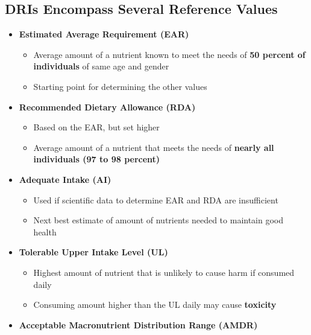 \documentclass[12pt]{article}
\begin{document}
        \subsection{DRIs Encompass Several Reference Values}
            \begin{itemize}
                \item \textbf{Estimated Average Requirement (EAR)}
                    \begin{itemize}
                        \item Average amount of a nutrient known to meet the needs of \textbf{50 percent of individuals} of same age and gender
                        \item Starting point for determining the other values
                    \end{itemize}
                \item \textbf{Recommended Dietary Allowance (RDA)}
                    \begin{itemize}
                        \item Based on the EAR, but set higher
                        \item Average amount of a nutrient that meets the needs of \textbf{nearly all individuals (97 to 98 percent)}
                    \end{itemize}
                \item \textbf{Adequate Intake (AI)}
                    \begin{itemize}
                        \item Used if scientific data to determine EAR and RDA are insufficient
                        \item Next best estimate of amount of nutrients needed to maintain good health
                    \end{itemize}
                \item \textbf{Tolerable Upper Intake Level (UL)}
                    \begin{itemize}
                        \item Highest amount of nutrient that is unlikely to cause harm if consumed daily
                        \item Consuming amount higher than the UL daily may cause \textbf{toxicity}
                    \end{itemize}
                \item \textbf{Acceptable Macronutrient Distribution Range (AMDR)}
                    \begin{itemize}

\end{itemize}
\end{itemize}
\end{document}
